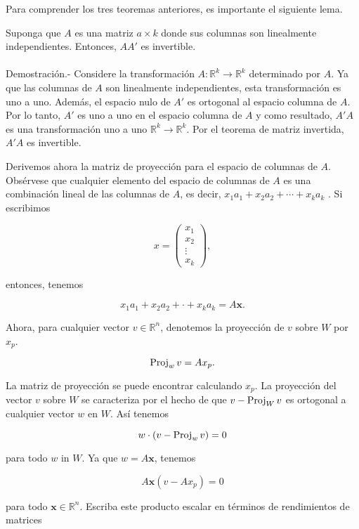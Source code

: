 Para comprender los tres teoremas anteriores, es importante el siguiente lema.

\begin{lema}
    Suponga que $A$ es una matriz $a\times k$ donde sus columnas son linealmente independientes. Entonces, $AA'$ es invertible.\\\\
	Demostración.-\; Considere la transformación $A:\mathbb{R}^k\to \mathbb{R}^k$ determinado por $A$. Ya que las columnas de $A$ son linealmente independientes, esta transformación es uno a uno. Además, el espacio nulo de $A'$ es ortogonal al espacio columna de $A$. Por lo tanto, $A'$ es uno a uno en el espacio columna de $A$ y como resultado, $A'A$ es una transformación uno a uno $\mathbb{R}^k\to \mathbb{R}^k$. Por el teorema de matriz invertida, $A'A$ es invertible.
\end{lema}

Derivemos ahora la matriz de proyección para el espacio de columnas de $A$. Obsérvese que cualquier elemento del espacio de columnas de $A$ es una combinación lineal de las columnas de $A$, es decir, $x_1 a_1 + x_2 a_2 + \cdots + x_k a_k$ . Si escribimos

$$
x=
\left(
    \begin{array}{c}
	x_1\\
	x_2\\
	\vdots\\
	x_k
    \end{array}
\right),
$$

entonces, tenemos

$$x_1a_1+x_2a_2+\cdot + x_ka_k=A\textbf{x}.$$

Ahora, para cualquier vector $v\in \mathbb{R}^n$, denotemos la proyección de $v$ sobre $W$ por $x_p$.

$$\mathop{\mbox{\normalfont Proj}}\nolimits_w v = Ax_p.$$

La matriz de proyección se puede encontrar calculando $x_p$. La proyección del vector $v$ sobre $W$ se caracteriza por el hecho de que $v - \mathop{\mbox{\normalfont Proj}}\nolimits_W v$ es ortogonal a cualquier vector $w$ en $W$. Así tenemos

$$w\cdot (v-\mathop{\mbox{\normalfont Proj}}\nolimits_w v)=0$$

para todo $w$ in $W$. Ya que $w=A\textbf{x}$, tenemos

$$A\textbf{x}(v-Ax_p)=0$$

para todo $\textbf{x}\in \mathbb{R}^n$. Escriba este producto escalar en términos de rendimientos de matrices

